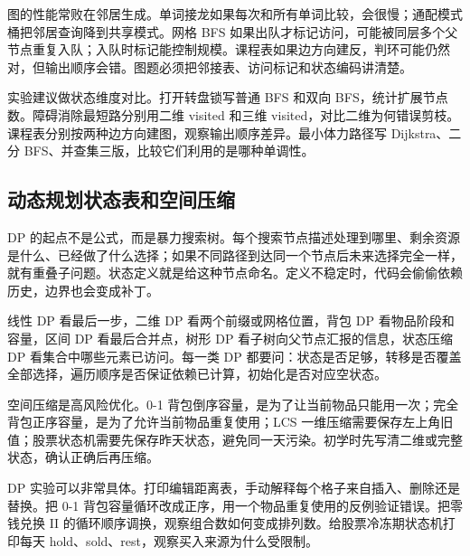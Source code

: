 图的性能常败在邻居生成。单词接龙如果每次和所有单词比较，会很慢；通配模式桶把邻居查询降到共享模式。网格 BFS 如果出队才标记访问，可能被同层多个父节点重复入队；入队时标记能控制规模。课程表如果边方向建反，判环可能仍然对，但输出顺序会错。图题必须把邻接表、访问标记和状态编码讲清楚。

实验建议做状态维度对比。打开转盘锁写普通 BFS 和双向 BFS，统计扩展节点数。障碍消除最短路分别用二维 visited 和三维 visited，对比二维为何错误剪枝。课程表分别按两种边方向建图，观察输出顺序差异。最小体力路径写 Dijkstra、二分 BFS、并查集三版，比较它们利用的是哪种单调性。

\subsection{动态规划状态表和空间压缩}

DP 的起点不是公式，而是暴力搜索树。每个搜索节点描述处理到哪里、剩余资源是什么、已经做了什么选择；如果不同路径到达同一个节点后未来选择完全一样，就有重叠子问题。状态定义就是给这种节点命名。定义不稳定时，代码会偷偷依赖历史，边界也会变成补丁。

线性 DP 看最后一步，二维 DP 看两个前缀或网格位置，背包 DP 看物品阶段和容量，区间 DP 看最后合并点，树形 DP 看子树向父节点汇报的信息，状态压缩 DP 看集合中哪些元素已访问。每一类 DP 都要问：状态是否足够，转移是否覆盖全部选择，遍历顺序是否保证依赖已计算，初始化是否对应空状态。

空间压缩是高风险优化。0-1 背包倒序容量，是为了让当前物品只能用一次；完全背包正序容量，是为了允许当前物品重复使用；LCS 一维压缩需要保存左上角旧值；股票状态机需要先保存昨天状态，避免同一天污染。初学时先写清二维或完整状态，确认正确后再压缩。

DP 实验可以非常具体。打印编辑距离表，手动解释每个格子来自插入、删除还是替换。把 0-1 背包容量循环改成正序，用一个物品重复使用的反例验证错误。把零钱兑换 II 的循环顺序调换，观察组合数如何变成排列数。给股票冷冻期状态机打印每天 hold、sold、rest，观察买入来源为什么受限制。

